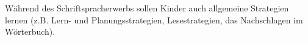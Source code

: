 Während des Schriftspracherwerbs sollen Kinder auch allgemeine Strategien lernen (z.B. Lern- und Planungsstrategien, Lesestrategien, das Nachschlagen im Wörterbuch).